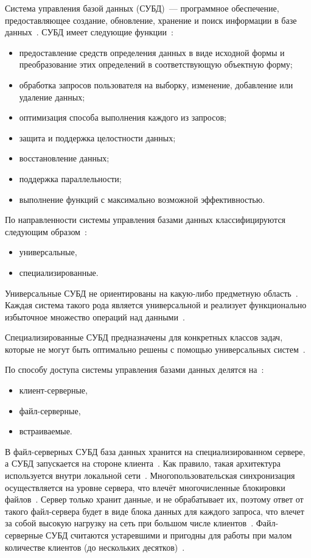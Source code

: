 Система управления базой данных (СУБД)~--- программное обеспечение, предоставляющее создание, обновление, хранение и поиск информации в базе данных~\cite{db}.
СУБД имеет следующие функции~\cite{db}:
\begin{itemize}
	\item предоставление средств определения данных в виде исходной формы и преобразование этих определений в соответствующую объектную форму;
	\item обработка запросов пользователя на выборку, изменение, добавление или удаление данных;
	\item оптимизация способа выполнения каждого из запросов;
	\item защита и поддержка целостности данных;
	\item восстановление данных;
	\item поддержка параллельности;
	\item выполнение функций с максимально возможной эффективностью.
\end{itemize}

По направленности системы управления базами данных классифицируются следующим образом~\cite{dbmsu}:
\begin{itemize}
	\item универсальные,
	\item специализированные.
\end{itemize}

Универсальные СУБД не ориентированы на какую-либо предметную область~\cite{dbmsu}.
Каждая система такого рода является универсальной и реализует функционально избыточное множество операций над данными~\cite{dbmsu}.

Специализированные СУБД предназначены для конкретных классов задач, которые не могут быть оптимально решены с помощью универсальных систем~\cite{dbmsu}.

По способу доступа системы управления базами данных делятся на~\cite{dbmsu}:
\begin{itemize}
	\item клиент-серверные,
	\item файл-серверные,
	\item встраиваемые.
\end{itemize}

В файл-серверных СУБД база данных хранится на специализированном сервере, а СУБД запускается на стороне клиента~\cite{dbmsu}.
Как правило, такая архитектура используется внутри локальной сети~\cite{dbmsu}.
Многопользовательская синхронизация осуществляется на уровне сервера, что влечёт многочисленные блокировки файлов~\cite{dbmsu}.
Сервер только хранит данные, и не обрабатывает их, поэтому ответ от такого файл-сервера будет в виде блока данных для каждого запроса, что влечет за собой высокую нагрузку на сеть при большом числе клиентов~\cite{dbmsu}.
Файл-серверные СУБД считаются устаревшими и пригодны для работы при малом количестве клиентов (до нескольких десятков)~\cite{dbmsu}.

